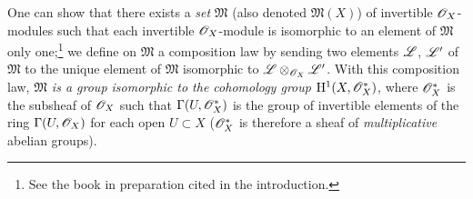 \begin{env}[5.4.7]
\label{env-0.5.4.7}
One can show that there exists a {\em set} $\mathfrak{M}$ (also denoted
$\mathfrak{M}(X)$) of invertible $\mathscr{O}_X$-modules such that each invertible
$\mathscr{O}_X$-module is isomorphic to an element of $\mathfrak{M}$ only
one;\footnote{See the book in preparation cited in the introduction.} we define
on $\mathfrak{M}$ a composition law by sending two elements $\mathscr{L}$, $\mathscr{L}'$
of $\mathfrak{M}$ to the unique element of $\mathfrak{M}$ isomorphic to
$\mathscr{L}\otimes_{\mathscr{O}_X}\mathscr{L}'$. With this composition law, {\em $\mathfrak{M}$
is a group isomorphic to the cohomology group $\mathrm{H}^1(X,\mathscr{O}_X^*)$}, where
$\mathscr{O}_X^*$ is the subsheaf of $\mathscr{O}_X$ such that $\Gamma(U,\mathscr{O}_X^*)$ is the group
of invertible elements of the ring $\Gamma(U,\mathscr{O}_X)$ for each open $U\subset X$
($\mathscr{O}_X^*$ is therefore a sheaf of {\em multiplicative} abelian groups).


\end{env}
